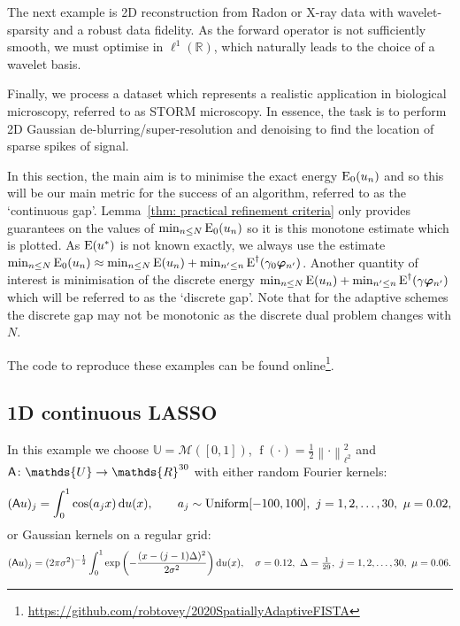 \documentclass[smallextended]{svjour3}
\let\F\mathds\let\C\mathcal\newcommand{\R}{\F{R}}\newcommand{\A}{\tens{A}}
\newcommand{\norm}[1]{{\left\lVert #1 \right\rVert}}
\newcommand{\op}[1]{\operatorname{#1}}
\newcommand{\1}{\F{1}}
\newcommand{\diff}{\mathop{}\!\mathrm{d}}
\newcommand*{\var}[1]{%
	\IfEqCase{#1}{%
		{0}{u}%
		{1}{v}%
		{2}{w}%
	}[u#1]%
}
\newcommand*{\vars}[1]{%
	\IfEqCase{#1}{%
		{0}{\alpha}%
		{1}{\beta}%
		{2}{\gamma}%
		{3}{a}%
		{4}{b}%
		{5}{c}%
	}[k#1]%
}
\begin{document}
	The next example is 2D reconstruction from Radon or X-ray data with wavelet-sparsity and a robust data fidelity. As the forward operator is not sufficiently smooth, we must optimise in $\ell^1(\R)$, which naturally leads to the choice of a wavelet basis. 
	
	Finally, we process a dataset which represents a realistic application in biological microscopy, referred to as STORM microscopy. In essence, the task is to perform 2D Gaussian de-blurring/super-resolution and denoising to find the location of sparse spikes of signal.
	
	In this section, the main aim is to minimise the exact energy $\op{E}_0(\var0_n)$ and so this will be our main metric for the success of an algorithm, referred to as the `continuous gap'. Lemma~\ref{thm: practical refinement criteria} only provides guarantees on the values of $\min_{n\leq N}\op{E}_0(\var0_n)$ so it is this monotone estimate which is plotted. As $\op{E}(\var0^*)$ is not known exactly, we always use the estimate $\min_{n\leq N}\op{E}_0(\var0_n) \approx \min_{n\leq N}\op{E}(\var0_n) + \min_{n'\leq n}\op{E}^\dag(\vars2_0\vec{\varphi}_{n'})$. Another quantity of interest is minimisation of the discrete energy $\min_{n\leq N}\op{E}(\var0_n) + \min_{n'\leq n}\op{E}^\dag(\vars2\vec{\varphi}_{n'})$ which will be referred to as the `discrete gap'. Note that for the adaptive schemes the discrete gap may not be monotonic as the discrete dual problem changes with $N$.
	
	The code to reproduce these examples can be found online\footnote{\href{https://github.com/robtovey/2020SpatiallyAdaptiveFISTA}{https://github.com/robtovey/2020SpatiallyAdaptiveFISTA}}.
	
	
	\subsection{1D continuous LASSO}\label{sec: 1D Lasso examples}
	In this example we choose $\F{U}=\C M([0,1])$, $\op{f}(\cdot)=\frac12\norm{\cdot}_{\ell^2}^2$ and $\A\colon \F{U}\to \R^{30}$ with either random Fourier kernels:
	\begin{equation}
		(\A\var0)_j = \int_0^1\cos(\vars3_jx)\diff\var0(x), \qquad \vars3_j\sim \op{Uniform}[-100,100],\ j=1,2,\ldots,30,\ \mu =0.02, 
	\end{equation}
	or Gaussian kernels on a regular grid:
	\begin{equation}
		(\A\var0)_j = (2\pi\sigma^2)^{-\frac12}\int_0^1\exp\left(-\frac{(x-(j-1)\Delta)^2}{2\sigma^2}\right)\diff\var0(x), \quad \sigma=0.12,\ \Delta = \tfrac1{29},\ j=1,2,\ldots,30,\ \mu=0.06.
	\end{equation}
	
\end{document}

